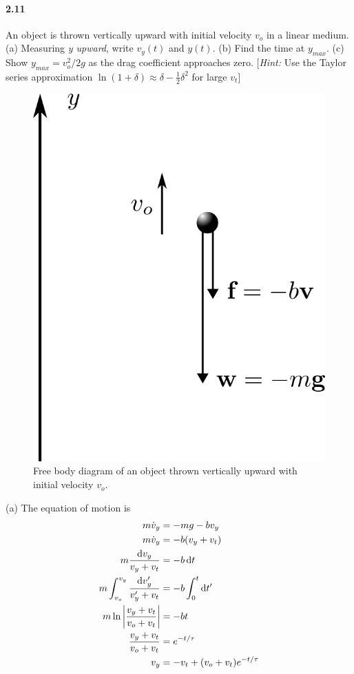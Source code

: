 \documentclass[../problems.tex]{subfiles}
\begin{document}
\paragraph{2.11} An object is thrown vertically upward with initial velocity $v_{o}$ in a linear
medium. (a) Measuring \textit{y upward}, write $v_y(t)$ and $y(t)$. (b) Find the time at $y_{max}$.
(c) Show $y_{max} = v_{o}^2/2g$ as the drag coefficient approaches zero. [\textit{Hint:} Use the
Taylor series approximation $\ln (1 + \delta) \approx \delta - \frac{1}{2}\delta^2$ for large $v_t$]
\barh 
\begin{figure}[ht]
    \centering
    \includegraphics[scale=1]{fig2_11.png}
    \caption{Free body diagram of an object thrown vertically upward with initial velocity $v_o$.}
    \label{fig:2_11}
\end{figure}
(a) The equation of motion is
\begin{align*}
    m \dot{v}_y &= -mg - b v_y \\
    m \dot{v}_y &= -b(v_y + v_t)\\
    m \frac{\dd{v_y}}{v_y + v_t} &= -b \dd{t} \\
    m \int_{v_{o}}^{v_y} \frac{\dd{v_y'}}{v_y' + v_t} &= -b \int_0^t \dd{t'} \\
    m \ln \abs{\frac{v_y + v_t}{v_{o} + v_t}} &= -bt \\
    \frac{v_y + v_t}{v_{o} + v_t} &= e^{-t/\tau} \\
    v_y &= -v_t + (v_{o} + v_t)e^{-t/\tau}
\end{align*}
\end{document}
